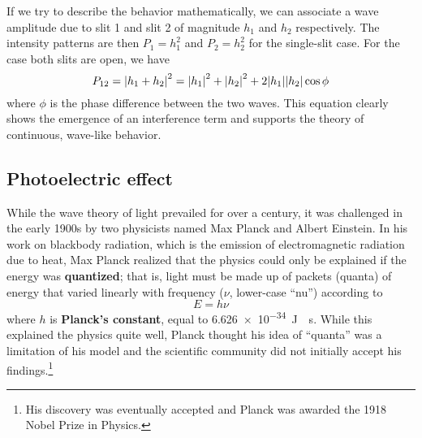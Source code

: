 If we try to describe the behavior mathematically, we can associate a wave amplitude due to slit 1 and slit 2 of magnitude $h_1$ and $h_2$ respectively. The intensity patterns are then $P_1=h_1^2$ and $P_2=h_2^2$ for the single-slit case. For the case both slits are open, we have
\begin{equation}
	P_{12} = \abs{h_1+h_2}^2 = \abs{h_1}^2 + \abs{h_2}^2 + 2\abs{h_1}\abs{h_2} \cos \phi  \label{eq:interf}
\end{equation}
where $\phi$ is the phase difference between the two waves. This equation clearly shows the emergence of an interference term and supports the theory of continuous, wave-like behavior. \par


\subsection{Photoelectric effect}
While the wave theory of light prevailed for over a century, it was challenged in the early 1900s by two physicists named Max Planck and Albert Einstein. In his work on blackbody radiation, which is the emission of electromagnetic radiation due to heat, Max Planck realized that the physics could only be explained if the energy was \textbf{quantized}; that is, light must be made up of packets (quanta) of energy that varied linearly with frequency ($\nu$, lower-case ``nu'') according to
\begin{equation}
	E = h\nu \label{eq:planck}
\end{equation}
where $h$ is \textbf{Planck's constant}, equal to \SI{6.626e-34}{\joule \cdot \second}. While this explained the physics quite well, Planck thought his idea of ``quanta'' was a limitation of his model and the scientific community did not initially accept his findings.\footnote{His discovery was eventually accepted and Planck was awarded the 1918 Nobel Prize in Physics.} \par

